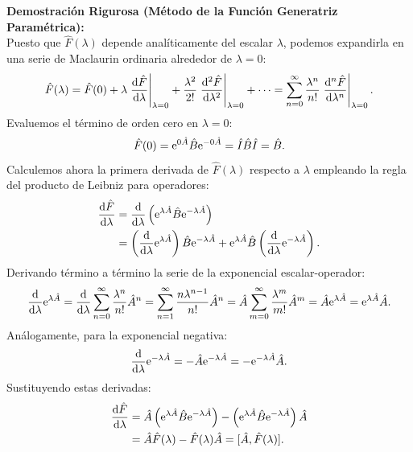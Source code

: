 \textbf{Demostración Rigurosa (Método de la Función Generatriz Paramétrica):}\\
Puesto que $\hat{F}(\lambda)$ depende analíticamente del escalar $\lambda$, podemos expandirla en una serie de Maclaurin ordinaria alrededor de $\lambda = 0$:
\begin{equation}
    \hat{F}(\lambda) = \hat{F}(0) + \lambda\left.\frac{\mathrm{d}\hat{F}}{\mathrm{d} \lambda}\right|_{\lambda=0} + \frac{\lambda^2}{2!}\left.\frac{\mathrm{d}^2\hat{F}}{\mathrm{d} \lambda^2}\right|_{\lambda=0} + \dots = \sum_{n=0}^\infty \frac{\lambda^n}{n!} \left.\frac{\mathrm{d}^n\hat{F}}{\mathrm{d} \lambda^n}\right|_{\lambda=0}.
    \label{eq:hadamard_maclaurin}
\end{equation}
Evaluemos el término de orden cero en $\lambda = 0$:
\begin{equation}
    \hat{F}(0) = \mathrm{e}^{0\hat{A}}\hat{B}\mathrm{e}^{-0\hat{A}} = \hat{I}\hat{B}\hat{I} = \hat{B}.
\end{equation}
Calculemos ahora la primera derivada de $\hat{F}(\lambda)$ respecto a $\lambda$ empleando la regla del producto de Leibniz para operadores:
\begin{align}
    \frac{\mathrm{d}\hat{F}}{\mathrm{d} \lambda} &= \frac{\mathrm{d}}{\mathrm{d} \lambda}\left( \mathrm{e}^{\lambda\hat{A}}\hat{B}\mathrm{e}^{-\lambda\hat{A}} \right) \nonumber\\
    &= \left(\frac{\mathrm{d}}{\mathrm{d} \lambda}\mathrm{e}^{\lambda\hat{A}}\right)\hat{B}\mathrm{e}^{-\lambda\hat{A}} + \mathrm{e}^{\lambda\hat{A}}\hat{B}\left(\frac{\mathrm{d}}{\mathrm{d} \lambda}\mathrm{e}^{-\lambda\hat{A}}\right).
\end{align}
Derivando término a término la serie de la exponencial escalar-operador:
\begin{equation}
    \frac{\mathrm{d}}{\mathrm{d} \lambda}\mathrm{e}^{\lambda\hat{A}} = \frac{\mathrm{d}}{\mathrm{d} \lambda}\sum_{n=0}^\infty \frac{\lambda^n}{n!}\hat{A}^n = \sum_{n=1}^\infty \frac{n \lambda^{n-1}}{n!}\hat{A}^n = \hat{A}\sum_{m=0}^\infty \frac{\lambda^m}{m!}\hat{A}^m = \hat{A}\mathrm{e}^{\lambda\hat{A}} = \mathrm{e}^{\lambda\hat{A}}\hat{A}.
\end{equation}
Análogamente, para la exponencial negativa:
\begin{equation}
    \frac{\mathrm{d}}{\mathrm{d} \lambda}\mathrm{e}^{-\lambda\hat{A}} = -\hat{A}\mathrm{e}^{-\lambda\hat{A}} = -\mathrm{e}^{-\lambda\hat{A}}\hat{A}.
\end{equation}
Sustituyendo estas derivadas:
\begin{align}
    \frac{\mathrm{d}\hat{F}}{\mathrm{d} \lambda} &= \hat{A}\left(\mathrm{e}^{\lambda\hat{A}}\hat{B}\mathrm{e}^{-\lambda\hat{A}}\right) - \left(\mathrm{e}^{\lambda\hat{A}}\hat{B}\mathrm{e}^{-\lambda\hat{A}}\right)\hat{A} \nonumber\\
    &= \hat{A}\hat{F}(\lambda) - \hat{F}(\lambda)\hat{A} = [\hat{A}, \hat{F}(\lambda)].
    \label{eq:hadamard_first_diff}
\end{align}
